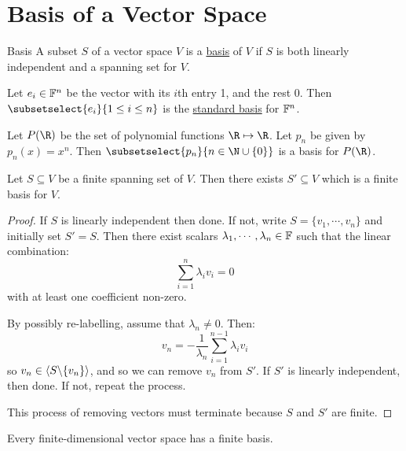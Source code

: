 \documentclass[../Main.tex]{subfiles}
\begin{document}
\section{Basis of a Vector Space}
\begin{definition}{Basis}
    A subset $S$ of a vector space $V$ is a \underline{basis} of $V$ if $S$ is both linearly independent and a spanning set for $V$.
\end{definition}
\begin{examples}{}
    \item Let $e_i \in \mathbb{F}^n$ be the vector with its $i$th entry 1, and the rest $0$. Then $\subsetselect{e_i}{1 \leq i \leq n}$ is the \underline{standard basis} for $\mathbb{F}^n$.
    \item Let $P(\R)$ be the set of polynomial functions $\R \mapsto \R$. Let $p_n$ be given by $p_n(x) = x^n$. Then $\subsetselect{p_n}{n \in \N \cup \{0\}}$ is a basis for $P(\R)$.
\end{examples}
\begin{proposition}
    Let $S \subseteq V$ be a finite spanning set of $V$. Then there exists $S' \subseteq V$ which is a finite basis for $V$.
    \label{propFinDimByBasis}
\end{proposition}
\begin{proof}
    If $S$ is linearly independent then done. If not, write $S = \{v_1, \cdots, v_n\}$ and initially set $S' = S$. Then there exist scalars $\lambda_1, \cdots, \lambda_n \in \mathbb{F}$ such that the linear combination:
    \begin{equation*}
        \sum_{i = 1}^n \lambda_i v_i = 0
    \end{equation*}
    with at least one coefficient non-zero.

    By possibly re-labelling, assume that $\lambda_n \neq 0$. Then:
    \begin{equation*}
        v_n = -\frac{1}{\lambda_n} \sum_{i = 1}^{n - 1} \lambda_i v_i
    \end{equation*}
    so $v_n \in \langle S \backslash \{v_n\} \rangle$, and so we can remove $v_n$ from $S'$. If $S'$ is linearly independent, then done. If not, repeat the process.

    This process of removing vectors must terminate because $S$ and $S'$ are finite.
\end{proof}
\begin{corollary}
    Every finite-dimensional vector space has a finite basis.
    \label{corFinDimByBasis}
\end{corollary}
\end{document}
